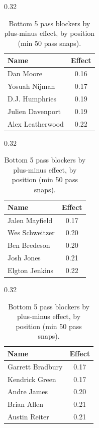 \begin{table}[h!]
\centering
\begin{subtable}{0.32\textwidth}
\centering
\footnotesize
\begin{tabular}{lc}
\toprule
Name & Effect \\
\midrule
Dan Moore & 0.16 \\
Yosuah Nijman & 0.17 \\
D.J. Humphries & 0.19 \\
Julien Davenport & 0.19 \\
Alex Leatherwood & 0.22 \\
\bottomrule
\end{tabular}
\caption{T}
\end{subtable}
\hfill
\begin{subtable}{0.32\textwidth}
\centering
\footnotesize
\begin{tabular}{lc}
\toprule
Name & Effect \\
\midrule
Jalen Mayfield & 0.17 \\
Wes Schweitzer & 0.20 \\
Ben Bredeson & 0.20 \\
Josh Jones & 0.21 \\
Elgton Jenkins & 0.22 \\
\bottomrule
\end{tabular}
\caption{G}
\end{subtable}
\hfill
\begin{subtable}{0.32\textwidth}
\centering
\footnotesize
\begin{tabular}{lc}
\toprule
Name & Effect \\
\midrule
Garrett Bradbury & 0.17 \\
Kendrick Green & 0.17 \\
Andre James & 0.20 \\
Brian Allen & 0.21 \\
Austin Reiter & 0.21 \\
\bottomrule
\end{tabular}
\caption{C}
\end{subtable}
\caption{Bottom 5 pass blockers by plus-minus effect, by position (min 50 pass snaps).}
\label{tab:blocker_pm_bot}
\end{table}
